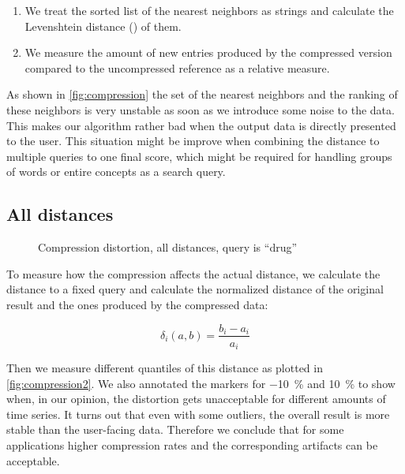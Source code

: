 \begin{enumerate}
    \item We treat the sorted list of the nearest neighbors as strings and calculate the Levenshtein distance (\cite{levenshtein}) of them.
    \item We measure the amount of new entries produced by the compressed version compared to the uncompressed reference as a relative measure.
\end{enumerate}

As shown in \autoref{fig:compression} the set of the nearest neighbors and the ranking of these neighbors is very unstable as soon as we introduce some noise to the data. This makes our algorithm rather bad when the output data is directly presented to the user. This situation might be improve when combining the distance to multiple queries to one final score, which might be required for handling groups of words or entire concepts as a search query.


\subsection{All distances}
\label{ssec:evaluation:distortion:dist}

\begin{figure}
    \centering
    
    \caption{Compression distortion, all distances, query is \enquote{drug}}\label{fig:compression2}
\end{figure}

To measure how the compression affects the actual distance, we calculate the distance to a fixed query and calculate the normalized distance of the original result and the ones produced by the compressed data:

\begin{equation}
    \delta_i(a, b) = \frac{b_i - a_i}{a_i}
\end{equation}

Then we measure different quantiles of this distance as plotted in \autoref{fig:compression2}. We also annotated the markers for \SI{-10}{\percent} and \SI{10}{\percent} to show when, in our opinion, the distortion gets unacceptable for different amounts of time series. It turns out that even with some outliers, the overall result is more stable than the user-facing data. Therefore we conclude that for some applications higher compression rates and the corresponding artifacts can be acceptable.



